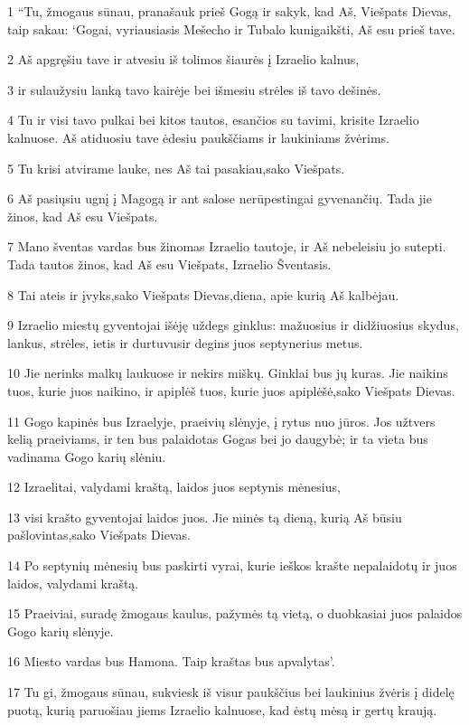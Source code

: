 \par 1 “Tu, žmogaus sūnau, pranašauk prieš Gogą ir sakyk, kad Aš, Viešpats Dievas, taip sakau: ‘Gogai, vyriausiasis Mešecho ir Tubalo kunigaikšti, Aš esu prieš tave. 
\par 2 Aš apgręšiu tave ir atvesiu iš tolimos šiaurės į Izraelio kalnus, 
\par 3 ir sulaužysiu lanką tavo kairėje bei išmesiu strėles iš tavo dešinės. 
\par 4 Tu ir visi tavo pulkai bei kitos tautos, esančios su tavimi, krisite Izraelio kalnuose. Aš atiduosiu tave ėdesiu paukščiams ir laukiniams žvėrims. 
\par 5 Tu krisi atvirame lauke, nes Aš tai pasakiau,­sako Viešpats.­ 
\par 6 Aš pasiųsiu ugnį į Magogą ir ant salose nerūpestingai gyvenančių. Tada jie žinos, kad Aš esu Viešpats. 
\par 7 Mano šventas vardas bus žinomas Izraelio tautoje, ir Aš nebeleisiu jo sutepti. Tada tautos žinos, kad Aš esu Viešpats, Izraelio Šventasis. 
\par 8 Tai ateis ir įvyks,­sako Viešpats Dievas,­diena, apie kurią Aš kalbėjau. 
\par 9 Izraelio miestų gyventojai išėję uždegs ginklus: mažuosius ir didžiuosius skydus, lankus, strėles, ietis ir durtuvus­ir degins juos septynerius metus. 
\par 10 Jie nerinks malkų laukuose ir nekirs miškų. Ginklai bus jų kuras. Jie naikins tuos, kurie juos naikino, ir apiplėš tuos, kurie juos apiplėšė,­sako Viešpats Dievas.­ 
\par 11 Gogo kapinės bus Izraelyje, praeivių slėnyje, į rytus nuo jūros. Jos užtvers kelią praeiviams, ir ten bus palaidotas Gogas bei jo daugybė; ir ta vieta bus vadinama Gogo karių slėniu. 
\par 12 Izraelitai, valydami kraštą, laidos juos septynis mėnesius, 
\par 13 visi krašto gyventojai laidos juos. Jie minės tą dieną, kurią Aš būsiu pašlovintas,­sako Viešpats Dievas.­ 
\par 14 Po septynių mėnesių bus paskirti vyrai, kurie ieškos krašte nepalaidotų ir juos laidos, valydami kraštą. 
\par 15 Praeiviai, suradę žmogaus kaulus, pažymės tą vietą, o duobkasiai juos palaidos Gogo karių slėnyje. 
\par 16 Miesto vardas bus Hamona. Taip kraštas bus apvalytas’. 
\par 17 Tu gi, žmogaus sūnau, sukviesk iš visur paukščius bei laukinius žvėris į didelę puotą, kurią paruošiau jiems Izraelio kalnuose, kad ėstų mėsą ir gertų kraują. 
